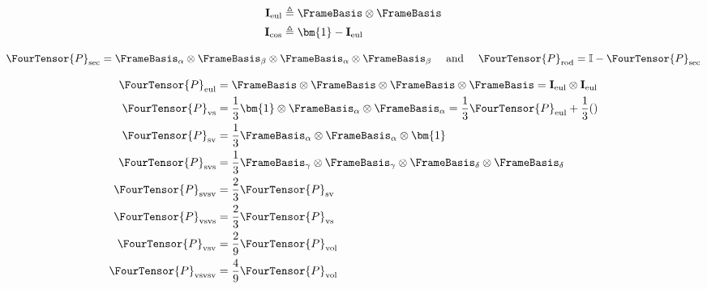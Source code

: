 \begin{equation}
\begin{aligned}
    \mathbf{I}_{\mathrm{eul}} & \triangleq \FrameBasis \otimes \FrameBasis \\
    \mathbf{I}_{\mathrm{cos}} & \triangleq \bm{1}-\mathbf{I}_{\mathrm{eul}} \\
\end{aligned}
\end{equation}

\[
\FourTensor{P}_{\mathrm{sec}} = \FrameBasis_{\alpha}\otimes\FrameBasis_{\beta}\otimes\FrameBasis_{\alpha}\otimes\FrameBasis_{\beta}
\quad\text{ and }\quad
\FourTensor{P}_{\mathrm{rod}} = \mathbb{I} - \FourTensor{P}_{\mathrm{sec}}
\]

$$
\begin{aligned}
\FourTensor{P}_{\mathrm{eul}}
&= \FrameBasis\otimes\FrameBasis\otimes\FrameBasis\otimes\FrameBasis = \mathbf{I}_{\mathrm{eul}}\otimes \mathbf{I}_{\mathrm{eul}}
\\
\FourTensor{P}_{\mathrm{vs}}
&= \frac{1}{3}\bm{1}\otimes\FrameBasis_{\alpha}\otimes\FrameBasis_{\alpha}
 = \frac{1}{3}\FourTensor{P}_{\mathrm{eul}} + \frac{1}{3}()
\\
\FourTensor{P}_{\mathrm{sv}}
&= \frac{1}{3}\FrameBasis_{\alpha}\otimes\FrameBasis_{\alpha}  \otimes \bm{1}
\\
\FourTensor{P}_{\mathrm{svs}} &
= \frac{1}{3}\FrameBasis_{\gamma}\otimes\FrameBasis_{\gamma}\otimes\FrameBasis_{\delta}\otimes\FrameBasis_{\delta}
\\
\FourTensor{P}_{\mathrm{svsv}}
&= \frac{2}{3} \FourTensor{P}_{\mathrm{sv}}
\\
\FourTensor{P}_{\mathrm{vsvs}} 
&=\frac{2}{3} \FourTensor{P}_{\mathrm{vs}}
\\
\FourTensor{P}_{\mathrm{vsv}} 
    &= \frac{2}{9}\FourTensor{P}_{\mathrm{vol}}
\\
\FourTensor{P}_{\mathrm{vsvsv}} 
    &= \frac{4}{9}\FourTensor{P}_{\mathrm{vol}}
\\
\end{aligned}
$$
